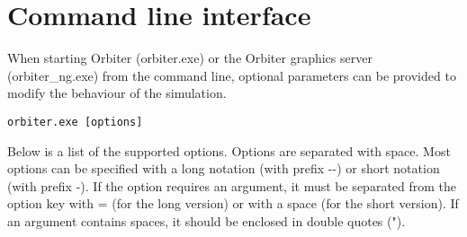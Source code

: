 \documentclass[Orbiter User Manual.tex]{subfiles}
\begin{document}
\section{Command line interface}
When starting Orbiter (orbiter.exe) or the Orbiter graphics server (orbiter\_ng.exe) from the command line, optional parameters can be provided to modify the behaviour of the simulation.

\begin{lstlisting}[language=OSFS]
orbiter.exe [options]
\end{lstlisting}

\noindent
Below is a list of the supported options. Options are separated with space. Most options can be specified with a long notation (with prefix -{}-) or short notation (with prefix -). If the option requires an argument, it must be separated from the option key with = (for the long version) or with a space (for the short version). If an argument contains spaces, it should be enclosed in double quotes (").
\end{document}
